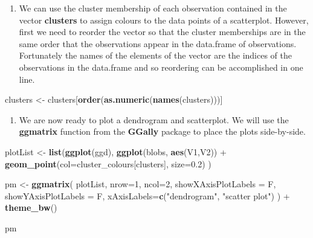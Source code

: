 \documentclass[]{book}
\newenvironment{Shaded}{\begin{snugshade}}{\end{snugshade}}
\newcommand{\KeywordTok}[1]{\textcolor[rgb]{0.13,0.29,0.53}{\textbf{{#1}}}}
\newcommand{\DataTypeTok}[1]{\textcolor[rgb]{0.13,0.29,0.53}{{#1}}}
\newcommand{\DecValTok}[1]{\textcolor[rgb]{0.00,0.00,0.81}{{#1}}}
\newcommand{\FloatTok}[1]{\textcolor[rgb]{0.00,0.00,0.81}{{#1}}}
\newcommand{\StringTok}[1]{\textcolor[rgb]{0.31,0.60,0.02}{{#1}}}
\newcommand{\NormalTok}[1]{{#1}}
\providecommand{\tightlist}{%
  \setlength{\itemsep}{0pt}\setlength{\parskip}{0pt}}
\theoremstyle{definition}
\theoremstyle{definition}
\theoremstyle{definition}
\theoremstyle{remark}
\begin{document}
\begin{Shaded}
\end{Shaded}

\begin{enumerate}
\def\labelenumi{\arabic{enumi}.}
\setcounter{enumi}{10}
\tightlist
\item
  We can use the cluster membership of each observation contained in the
  vector \textbf{clusters} to assign colours to the data points of a
  scatterplot. However, first we need to reorder the vector so that the
  cluster memberships are in the same order that the observations appear
  in the data.frame of observations. Fortunately the names of the
  elements of the vector are the indices of the observations in the
  data.frame and so reordering can be accomplished in one line.
\end{enumerate}

\begin{Shaded}
\begin{Highlighting}[]
\NormalTok{clusters <-}\StringTok{ }\NormalTok{clusters[}\KeywordTok{order}\NormalTok{(}\KeywordTok{as.numeric}\NormalTok{(}\KeywordTok{names}\NormalTok{(clusters)))]}
\end{Highlighting}
\end{Shaded}

\begin{enumerate}
\def\labelenumi{\arabic{enumi}.}
\setcounter{enumi}{11}
\tightlist
\item
  We are now ready to plot a dendrogram and scatterplot. We will use the
  \textbf{ggmatrix} function from the \textbf{GGally} package to place
  the plots side-by-side.
\end{enumerate}

\begin{Shaded}
\begin{Highlighting}[]
\NormalTok{plotList <-}\StringTok{ }\KeywordTok{list}\NormalTok{(}\KeywordTok{ggplot}\NormalTok{(ggd),}
                 \KeywordTok{ggplot}\NormalTok{(blobs, }\KeywordTok{aes}\NormalTok{(V1,V2)) +}\StringTok{ }
\StringTok{                   }\KeywordTok{geom_point}\NormalTok{(}\DataTypeTok{col=}\NormalTok{cluster_colours[clusters], }\DataTypeTok{size=}\FloatTok{0.2}\NormalTok{)}
                 \NormalTok{)}

\NormalTok{pm <-}\StringTok{ }\KeywordTok{ggmatrix}\NormalTok{(}
  \NormalTok{plotList, }\DataTypeTok{nrow=}\DecValTok{1}\NormalTok{, }\DataTypeTok{ncol=}\DecValTok{2}\NormalTok{, }\DataTypeTok{showXAxisPlotLabels =} \NormalTok{F, }\DataTypeTok{showYAxisPlotLabels =} \NormalTok{F, }
  \DataTypeTok{xAxisLabels=}\KeywordTok{c}\NormalTok{(}\StringTok{"dendrogram"}\NormalTok{, }\StringTok{"scatter plot"}\NormalTok{)}
\NormalTok{) +}\StringTok{ }\KeywordTok{theme_bw}\NormalTok{()}

\NormalTok{pm}
\end{Highlighting}
\end{Shaded}
\end{document}
